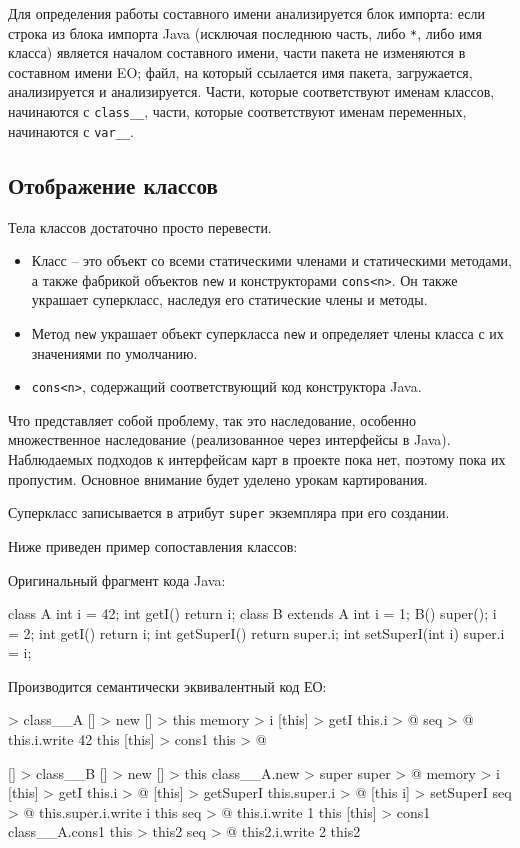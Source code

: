 \documentclass[oneside,final,14pt,a4paper]{extreport}
\theoremstyle{definition}
\theoremstyle{remark}
\theoremstyle{remark}
\begin{document}
Для определения работы составного имени анализируется блок импорта:
если строка из блока импорта Java (исключая последнюю часть, либо \texttt{*}, либо имя класса) является началом составного имени, части пакета не изменяются в составном имени EO; файл, на который ссылается имя пакета, загружается, анализируется и анализируется. Части, которые соответствуют именам классов, начинаются с \texttt{class\_\_}, части, которые соответствуют именам переменных, начинаются с \texttt{var\_\_}.


\subsection{Отображение классов}

Тела классов достаточно просто перевести.
\begin{itemize}
  \item Класс – это объект со всеми статическими членами и статическими методами, а также фабрикой объектов \texttt{new} и конструкторами \texttt{cons<n>}. Он также украшает суперкласс, наследуя его статические члены и методы.
  \item  Метод  \texttt{new} украшает объект суперкласса \texttt{new} и определяет члены класса с их значениями по умолчанию.
    \item \texttt{cons<n>}, содержащий соответствующий код конструктора Java.
\end{itemize}

Что представляет собой проблему, так это наследование, особенно множественное наследование (реализованное через интерфейсы в Java). Наблюдаемых подходов к интерфейсам карт в проекте пока нет, поэтому пока их пропустим. Основное внимание будет уделено урокам картирования.

Суперкласс записывается в атрибут \texttt{super} экземпляра при его создании.


Ниже приведен пример сопоставления классов:

Оригинальный фрагмент кода Java:

\begin{ffcode}
class A {
  int i = 42;
  int getI() { return i; }
}
class B extends A {
  int i = 1;
  B() { super(); i = 2; }
  int getI() { return i; }
  int getSuperI() { return super.i; }
  int setSuperI(int i) { super.i = i; }
}
\end{ffcode}

Производится семантически эквивалентный код ЕО:
\begin{ffcode}
[] > class__A
[] > new
  [] > this
    memory > i
    [this] > getI
      this.i > @
  seq > @
    this.i.write 42
    this
[this] > cons1
  this > @

[] > class__B
[] > new
  [] > this
    class__A.new > super
    super > @
    memory > i
    [this] > getI
      this.i > @
    [this] > getSuperI
      this.super.i > @
    [this i] > setSuperI
      seq > @
        this.super.i.write i
        this
  seq > @
    this.i.write 1
    this
[this] > cons1
  class__A.cons1 this > this2
  seq > @
    this2.i.write 2
    this2
\end{ffcode}
\end{document}
